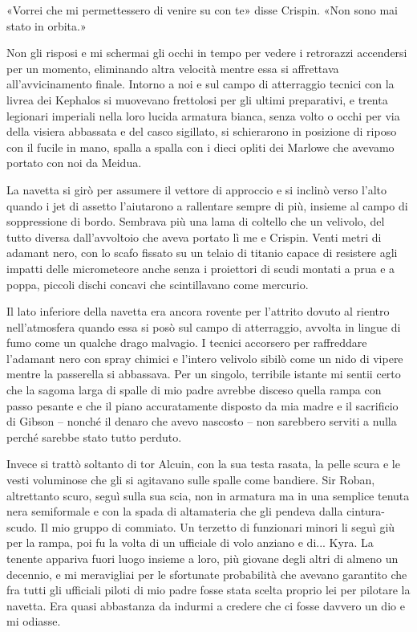 «Vorrei che mi permettessero di venire su con te» disse Crispin. «Non
sono mai stato in orbita.»

Non gli risposi e mi schermai gli occhi in tempo per vedere i retrorazzi
accendersi per un momento, eliminando altra velocità mentre essa si
affrettava all'avvicinamento finale. Intorno a noi e sul campo di
atterraggio tecnici con la livrea dei Kephalos si muovevano frettolosi
per gli ultimi preparativi, e trenta legionari imperiali nella loro
lucida armatura bianca, senza volto o occhi per via della visiera
abbassata e del casco sigillato, si schierarono in posizione di riposo
con il fucile in mano, spalla a spalla con i dieci opliti dei Marlowe
che avevamo portato con noi da Meidua.

La navetta si girò per assumere il vettore di approccio e si inclinò
verso l'alto quando i jet di assetto l'aiutarono a rallentare sempre di
più, insieme al campo di soppressione di bordo. Sembrava più una lama di
coltello che un velivolo, del tutto diversa dall'avvoltoio che aveva
portato lì me e Crispin. Venti metri di adamant nero, con lo scafo
fissato su un telaio di titanio capace di resistere agli impatti delle
micrometeore anche senza i proiettori di scudi montati a prua e a poppa,
piccoli dischi concavi che scintillavano come mercurio.

Il lato inferiore della navetta era ancora rovente per l'attrito dovuto
al rientro nell'atmosfera quando essa si posò sul campo di atterraggio,
avvolta in lingue di fumo come un qualche drago malvagio. I tecnici
accorsero per raffreddare l'adamant nero con spray chimici e l'intero
velivolo sibilò come un nido di vipere mentre la passerella si
abbassava. Per un singolo, terribile istante mi sentii certo che la
sagoma larga di spalle di mio padre avrebbe disceso quella rampa con
passo pesante e che il piano accuratamente disposto da mia madre e il
sacrificio di Gibson -- nonché il denaro che avevo nascosto -- non
sarebbero serviti a nulla perché sarebbe stato tutto perduto.

Invece si trattò soltanto di tor Alcuin, con la sua testa rasata, la
pelle scura e le vesti voluminose che gli si agitavano sulle spalle come
bandiere. Sir Roban, altrettanto scuro, seguì sulla sua scia, non in
armatura ma in una semplice tenuta nera semiformale e con la spada di
altamateria che gli pendeva dalla cintura-scudo. Il mio gruppo di
commiato. Un terzetto di funzionari minori li seguì giù per la rampa,
poi fu la volta di un ufficiale di volo anziano e di... Kyra. La tenente
appariva fuori luogo insieme a loro, più giovane degli altri di almeno
un decennio, e mi meravigliai per le sfortunate probabilità che avevano
garantito che fra tutti gli ufficiali piloti di mio padre fosse stata
scelta proprio lei per pilotare la navetta. Era quasi abbastanza da
indurmi a credere che ci fosse davvero un dio e mi odiasse.

